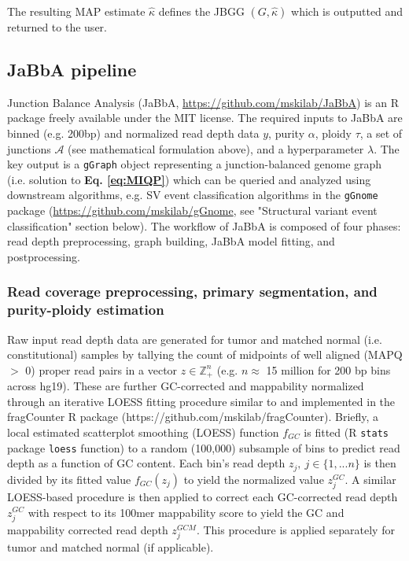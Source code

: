 \documentclass[phd,tocprelim]{cornell}
\newcommand{\ttt}[1]{\texttt{#1}}
\begin{document}
The resulting MAP estimate $\hat{\kappa}$ defines the JBGG $(G,\hat{\kappa})$ which is outputted and returned to the user. 


\subsection{JaBbA pipeline}
Junction Balance Analysis (JaBbA, \url{https://github.com/mskilab/JaBbA}) is an R package freely available under the MIT license. The required inputs to JaBbA are binned (e.g. 200bp) and normalized read depth data $y$, purity $\alpha$, ploidy $\tau$, a set of junctions $\mathcal{A}$ (see mathematical formulation above), and a hyperparameter $\lambda$. The key output is a \texttt{gGraph} object representing a junction-balanced genome graph (i.e. solution to \textbf{Eq. \ref{eq:MIQP}}) which can be queried and analyzed using downstream algorithms, e.g. SV event classification algorithms in the \texttt{gGnome} package (\url{https://github.com/mskilab/gGnome}, see "Structural variant event classification" section below). The workflow of JaBbA is composed of four phases: read depth preprocessing, graph building, JaBbA model fitting, and postprocessing.

\subsubsection*{Read coverage preprocessing, primary segmentation, and purity-ploidy estimation}
Raw input read depth data are generated for tumor and matched normal (i.e. constitutional) samples by tallying the count of midpoints of well aligned (MAPQ $>$ 0) proper read pairs in a vector $z \in \mathbb{Z}^n_+$ (e.g. $n \approx$ 15 million for 200 bp bins across hg19).  These are further GC-corrected and mappability normalized through an iterative LOESS fitting procedure similar to \cite{Ha:2012kr} and implemented in the fragCounter R package (https://github.com/mskilab/fragCounter). Briefly, a local estimated scatterplot smoothing (LOESS) function $f_{GC}$ is fitted (R \ttt{stats} package \ttt{loess} function) to a random (100,000) subsample of bins to predict read depth as a function of GC content. Each bin's read depth $z_j,~j \in \{1, ... n\}$ is then divided by its fitted value $f_{GC}(z_j)$ to yield the normalized value $z^{GC}_j$.  A similar LOESS-based procedure is then applied to correct each GC-corrected read depth $z^{GC}_j$ with respect to its 100mer mappability score to yield the GC and mappability corrected read depth $z^{GCM}_j$.  This procedure is applied separately for tumor and matched normal (if applicable).
\end{document}
